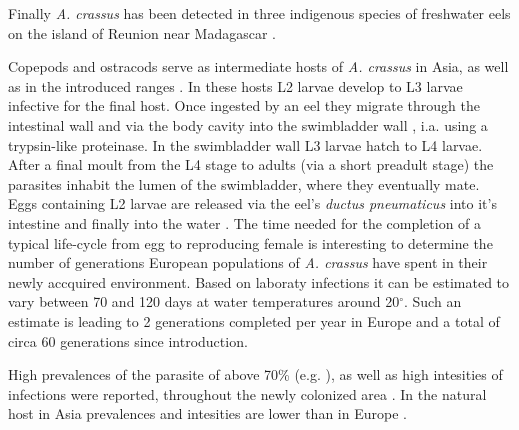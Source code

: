 Finally \textit{A. crassus} has been detected in three indigenous
species of freshwater eels on the island of Reunion near Madagascar
\cite{sasal_parasite_2008}.

Copepods and ostracods serve as intermediate hosts of
\textit{A. crassus} in Asia, as well as in the introduced ranges
\cite{moravec_first_2005}. In these hosts L2 larvae develop to L3
larvae infective for the final host. Once ingested by an eel they
migrate through the intestinal wall and via the body cavity into the
swimbladder wall \cite{haenen_effects_1996}, i.a. using a trypsin-like
proteinase\cite{polzer_identification_1993}. In the swimbladder wall
L3 larvae hatch to L4 larvae. After a final moult from the L4 stage to
adults (via a short preadult stage) the parasites inhabit the lumen of
the swimbladder, where they eventually mate. Eggs containing L2 larvae
are released via the eel's \textit{ductus pneumaticus} into it's
intestine and finally into the water
\cite{de_charleroy_life_1990}. The time needed for the completion of a
typical life-cycle from egg to reproducing female is interesting to
determine the number of generations European populations of
\textit{A. crassus} have spent in their newly accquired
environment. Based on laboraty infections it can be estimated to vary
between 70 and 120 days at water temperatures around 20$^{\circ}$.
Such an estimate is leading to 2 generations completed per year in
Europe and a total of circa 60 generations since introduction.



High prevalences of the parasite of above 70\%
(e.g. \cite{wrtz_distribution_1998,thomas1992population}), as well as
high intesities of infections were reported, throughout the newly
colonized area \cite{lefebvre_anguillicolosis:_2004}. In the natural
host in Asia prevalences and intesities are lower than in Europe
\cite{mnderle_occurrence_2006}.

